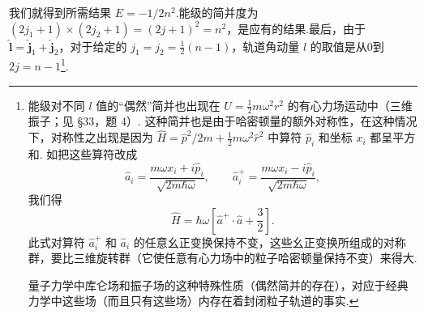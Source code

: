 我们就得到所需结果 $E=-1/2n^2$.能级的简并度为 $(2j_1+1)\times(2j_2+1)=(2j+1)^2=n^2$，是应有的结果.最后，由于 $\hat{\boldsymbol{l}}=\hat{\boldsymbol{j}}_1+\hat{\boldsymbol{j}}_2$，对于给定的 $j_1=j_2=\frac{1}{2}(n-1)$，轨道角动量 $l$ 的取值是从0到 $2j=n-1$\footnote{能级对不同 $l$ 值的“偶然”简并也出现在 $U=\frac{1}{2}m\omega^2r^2$ 的有心力场运动中（三维振子；见 §33，题 4）. 这种简并也是由于哈密顿量的额外对称性，在这种情况下，对称性之出现是因为 $\hat{H}=\hat{p}^2/2m+\frac{1}{2}m\omega^2\hat{r}^2$ 中算符 $\hat{p}_i$ 和坐标 $x_i$ 都呈平方和. 如把这些算符改成
\begin{equation*}
  \hat{a}_i=\frac{m\omega x_i+i\hat{p}_i}{\sqrt{2m\hbar\omega}},\qquad
  \hat{a}_i^{+}=\frac{m\omega x_i-i\hat{p}_i}{\sqrt{2m\hbar\omega}},
\end{equation*}
我们得
\begin{equation*}
  \hat{H}=\hbar\omega\left[\hat{a}^{+}\cdot\hat{a}+\frac{3}{2}\right].
\end{equation*}
此式对算符 $\hat{a}_i^{+}$ 和 $\hat{a}_i$ 的任意幺正变换保持不变，这些幺正变换所组成的对称群，要比三维旋转群（它使任意有心力场中的粒子哈密顿量保持不变）来得大.

量子力学中库仑场和振子场的这种特殊性质（偶然简并的存在），对应于经典力学中这些场（而且只有这些场）内存在着封闭粒子轨道的事实.}.

